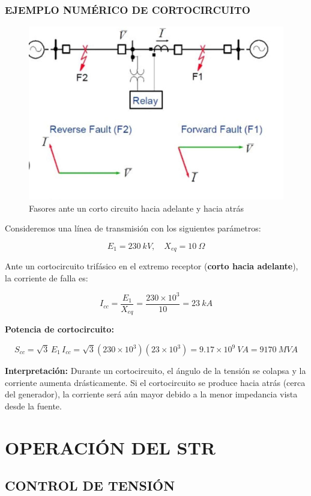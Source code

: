 \documentclass[a5paper]{book}%
\begin{document}
\section{EJEMPLO NUMÉRICO DE CORTOCIRCUITO}

\begin{figure}[H]
	\centering
	\includegraphics[width=0.7\linewidth]{cortcircuito}
	\caption{Fasores ante un corto circuito hacia adelante y hacia atrás}
	\label{fig:fasores2}
\end{figure}

Consideremos una línea de transmisión con los siguientes parámetros:

\[
E_{1} = 230~kV, \quad X_{eq} = 10~\Omega
\]

Ante un cortocircuito trifásico en el extremo receptor (\textbf{corto hacia adelante}), la corriente de falla es:

\[
I_{cc} = \dfrac{E_{1}}{X_{eq}} = \dfrac{230 \times 10^{3}}{10} = 23~kA
\]

\textbf{Potencia de cortocircuito:}

\[
S_{cc} = \sqrt{3} \, E_{1} \, I_{cc} = \sqrt{3} (230 \times 10^{3})(23 \times 10^{3}) = 9.17 \times 10^{9}~VA = 9170~MVA
\]

\textbf{Interpretación:}  
Durante un cortocircuito, el ángulo de la tensión se colapsa y la corriente aumenta drásticamente.  
Si el cortocircuito se produce hacia atrás (cerca del generador), la corriente será aún mayor debido a la menor impedancia vista desde la fuente.

\part{OPERACIÓN DEL STR}

\chapter{CONTROL DE TENSIÓN}
\end{document}
